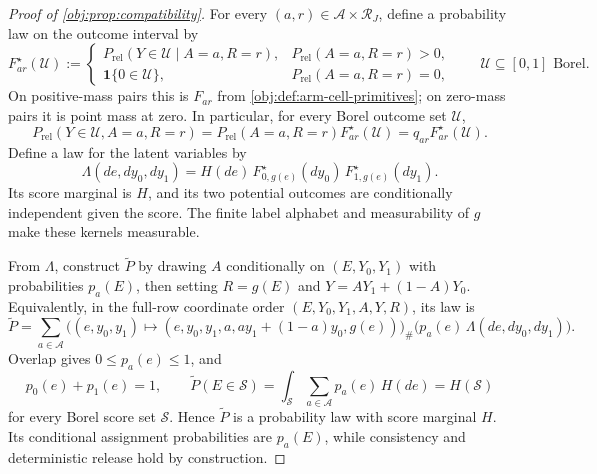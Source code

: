\begin{proof}[Proof of \cref{obj:prop:compatibility}]
For every \((a,r)\in\mathcal A\times\mathcal R_J\), define a probability law on the outcome interval by
\[
F^\star_{ar}(\mathcal U):=
\begin{cases}
P_{\mathrm{rel}}(Y\in\mathcal U\mid A=a,R=r), & P_{\mathrm{rel}}(A=a,R=r)>0,\\
\mathbf 1\{0\in\mathcal U\}, & P_{\mathrm{rel}}(A=a,R=r)=0,
\end{cases}
\qquad \mathcal U\subseteq[0,1]\text{ Borel}.
\]
On positive-mass pairs this is \(F_{ar}\) from \cref{obj:def:arm-cell-primitives}; on zero-mass pairs it is point mass at zero. In particular, for every Borel outcome set \(\mathcal U\),
\[
P_{\mathrm{rel}}(Y\in\mathcal U,A=a,R=r)
=P_{\mathrm{rel}}(A=a,R=r)F^\star_{ar}(\mathcal U)
=q_{ar}F^\star_{ar}(\mathcal U).
\]
Define a law for the latent variables by
\[
\Lambda(de,dy_0,dy_1)
=H(de)\,F^\star_{0,g(e)}(dy_0)\,F^\star_{1,g(e)}(dy_1).
\]
Its score marginal is \(H\), and its two potential outcomes are conditionally independent given the score. The finite label alphabet and measurability of \(g\) make these kernels measurable.

From \(\Lambda\), construct \(\widetilde P\) by drawing \(A\) conditionally on \((E,Y_0,Y_1)\) with probabilities \(p_a(E)\), then setting \(R=g(E)\) and \(Y=AY_1+(1-A)Y_0\). Equivalently, in the full-row coordinate order \((E,Y_0,Y_1,A,Y,R)\), its law is
\[
\widetilde P
=\sum_{a\in\mathcal A}
\bigl((e,y_0,y_1)\mapsto(e,y_0,y_1,a,ay_1+(1-a)y_0,g(e))\bigr)_{\#}
\bigl(p_a(e)\,\Lambda(de,dy_0,dy_1)\bigr).
\] Overlap gives \(0\leq p_a(e)\leq1\), and
\[
p_0(e)+p_1(e)=1,\qquad
\widetilde P(E\in\mathcal S)
=\int_{\mathcal S}\sum_{a\in\mathcal A}p_a(e)\,H(de)
=H(\mathcal S)
\]
for every Borel score set \(\mathcal S\). Hence \(\widetilde P\) is a probability law with score marginal \(H\). Its conditional assignment probabilities are \(p_a(E)\), while consistency and deterministic release hold by construction.


\end{proof}

